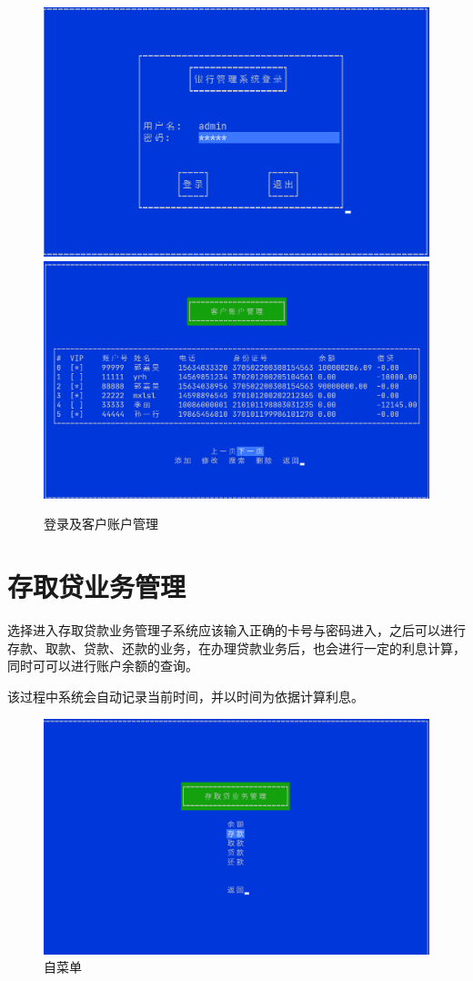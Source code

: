 \documentclass{ctexrep}
\begin{document}
\begin{figure}[H]
  \centering\includegraphics[scale=0.45]{preview_login.png}
  \includegraphics[scale=0.4]{preview_custom.png}
  \caption{登录及客户账户管理}
\end{figure}
\section{存取贷业务管理}
选择进入存取贷款业务管理子系统应该输入正确的卡号与密码进入，之后可以进行存款、取款、贷款、还款的业务，在办理贷款业务后，也会进行一定的利息计算，同时可可以进行账户余额的查询。

该过程中系统会自动记录当前时间，并以时间为依据计算利息。
\begin{figure}[H]
  \centering\includegraphics[scale=0.4]{preview_blance_submenu.png}
  \caption{自菜单}
\end{figure}
\end{document}

